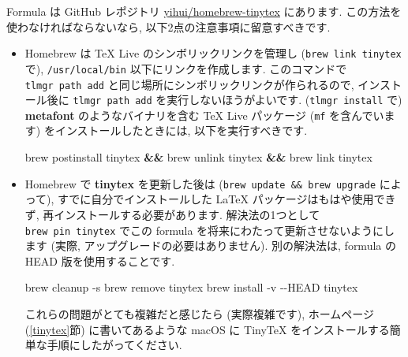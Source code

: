 \documentclass[
  xelatex,ja=standard,jafont=noto]{bxjsreport}
\newenvironment{Shaded}{\begin{snugshade}}{\end{snugshade}}
\newcommand{\AttributeTok}[1]{\textcolor[rgb]{0.77,0.63,0.00}{#1}}
\newcommand{\ExtensionTok}[1]{#1}
\newcommand{\KeywordTok}[1]{\textcolor[rgb]{0.13,0.29,0.53}{\textbf{#1}}}
\newcommand{\NormalTok}[1]{#1}
\begin{document}
Formula は GitHub レポジトリ
\href{https://github.com/yihui/homebrew-tinytex}{yihui/homebrew-tinytex}
にあります. この方法を使わなければならないなら,
以下2点の注意事項に留意すべきです.

\begin{itemize}
\item
  Homebrew は TeX Live のシンボリックリンクを管理し
  (\texttt{brew\ link\ tinytex} で), \texttt{/usr/local/bin}
  以下にリンクを作成します. このコマンドで \texttt{tlmgr\ path\ add}
  と同じ場所にシンボリックリンクが作られるので, インストール後に
  \texttt{tlmgr\ path\ add} を実行しないほうがよいです.
  (\texttt{tlmgr\ install} で) \textbf{metafont} のようなバイナリを含む
  TeX Live パッケージ (\texttt{mf} を含んでいます)
  をインストールしたときには, 以下を実行すべきです.

\begin{Shaded}
\begin{Highlighting}[]
\ExtensionTok{brew}\NormalTok{ postinstall tinytex }\KeywordTok{\&\&} \ExtensionTok{brew}\NormalTok{ unlink tinytex }\KeywordTok{\&\&} \ExtensionTok{brew}\NormalTok{ link tinytex}
\end{Highlighting}
\end{Shaded}
\item
  Homebrew で \textbf{tinytex} を更新した後は
  (\texttt{brew\ update\ \&\&\ brew\ upgrade} によって),
  すでに自分でインストールした LaTeX パッケージはもはや使用できず,
  再インストールする必要があります. 解決法の1つとして
  \texttt{brew\ pin\ tinytex} でこの formula
  を将来にわたって更新させないようにします (実際,
  アップグレードの必要はありません). 別の解決法は, formula の HEAD
  版を使用することです.

\begin{Shaded}
\begin{Highlighting}[]
\ExtensionTok{brew}\NormalTok{ cleanup }\AttributeTok{{-}s}
\ExtensionTok{brew}\NormalTok{ remove tinytex}
\ExtensionTok{brew}\NormalTok{ install }\AttributeTok{{-}v} \AttributeTok{{-}{-}HEAD}\NormalTok{ tinytex}
\end{Highlighting}
\end{Shaded}

  これらの問題がとても複雑だと感じたら (実際複雑です), ホームページ
  (\ref{tinytex}節) に書いてあるような macOS に TinyTeX
  をインストールする簡単な手順にしたがってください.
\end{itemize}
\end{document}
